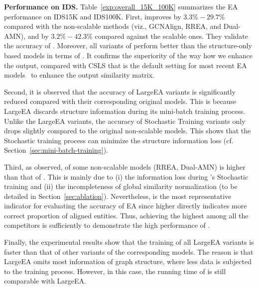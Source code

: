 \noindent
\textbf{Performance on IDS.}\label{sec:exp_ids}
Table~\ref{exp:overall_15K_100K} summarizes the EA performance on IDS15K and IDS100K.
First,  \ClusterEA{} improves \HitOne{} by   $3.3\%-29.7\%$ compared with the non-scalable methods (viz., GCNAlign, RREA, and Dual-AMN), and by $3.2\%-42.3\%$ compared against the scalable ones. They validate the accuracy of \ClusterEA{}.
%
Moreover, all variants of \ClusterEA{} perform better than the structure-only based models in terms of \HitOne{}. It confirms the superiority of the way how we enhance the output, compared with CSLS that is the default setting for most recent EA models~\cite{EVA20,EASY21, MRAEA20,RREA20, OpenEA2020VLDB, DualAMN21} to enhance the output similarity matrix.

Second, it is observed that the accuracy of LargeEA variants is significantly reduced compared with their corresponding original models. This is because LargeEA discards structure information during its mini-batch training process. Unlike the LargeEA variants, the accuracy of Stochastic Training variants only drops slightly compared to the original non-scalable models. This shows that the Stochastic training process can minimize the structure information loss (cf. Section~\ref{sec:mini-batch-training}).

Third, as observed,  \HitTen{} of some non-scalable models (RREA, Dual-AMN) is higher than that of \ClusterEA{}. This is mainly due to (i) the information loss during \ClusterEA{}'s Stochastic training and (ii) the incompleteness of global similarity normalization (to be detailed in Section~\ref{sec:ablation}). Nevertheless, \HitOne{} is the most representative indicator for evaluating the accuracy of EA since higher \HitOne{} directly indicates more correct proportion of aligned entities. Thus, achieving the highest \HitOne{} among all the competitors is sufficiently to demonstrate the high performance of \ClusterEA{}.

Finally, the experimental results show that the training of all LargeEA variants is faster than that of other variants of the corresponding models. The reason is that LargeEA omits most information of graph structure, where less data is subjected to the training process. However, in this case, the running time of \ClusterEA{} is still comparable with LargeEA.


